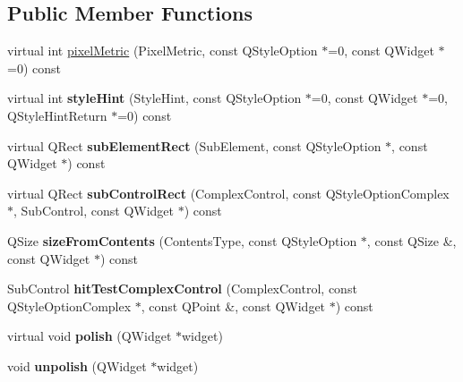 \subsection*{Public Member Functions}
\begin{DoxyCompactItemize}
\item 
virtual int \hyperlink{class_mg_style_af9090dfb05c3d8874a57eb237363b111}{pixel\+Metric} (Pixel\+Metric, const Q\+Style\+Option $\ast$=0, const Q\+Widget $\ast$=0) const
\item 
\mbox{\label{class_mg_style_a9c528faa0bfe29d7354443dd2e183a39}} 
virtual int {\bfseries style\+Hint} (Style\+Hint, const Q\+Style\+Option $\ast$=0, const Q\+Widget $\ast$=0, Q\+Style\+Hint\+Return $\ast$=0) const
\item 
\mbox{\label{class_mg_style_a55e50346cb797f317a26df24f4be553c}} 
virtual Q\+Rect {\bfseries sub\+Element\+Rect} (Sub\+Element, const Q\+Style\+Option $\ast$, const Q\+Widget $\ast$) const
\item 
\mbox{\label{class_mg_style_a94b75a98f71425f9be5441a89824d62f}} 
virtual Q\+Rect {\bfseries sub\+Control\+Rect} (Complex\+Control, const Q\+Style\+Option\+Complex $\ast$, Sub\+Control, const Q\+Widget $\ast$) const
\item 
\mbox{\label{class_mg_style_a0895d463d5bb9fafca488450c4cf077c}} 
Q\+Size {\bfseries size\+From\+Contents} (Contents\+Type, const Q\+Style\+Option $\ast$, const Q\+Size \&, const Q\+Widget $\ast$) const
\item 
\mbox{\label{class_mg_style_a350316ad09a86d6eeb1a5f2d30194361}} 
Sub\+Control {\bfseries hit\+Test\+Complex\+Control} (Complex\+Control, const Q\+Style\+Option\+Complex $\ast$, const Q\+Point \&, const Q\+Widget $\ast$) const
\item 
\mbox{\label{class_mg_style_a51959bf9ecaafbe71f05c568d7c583df}} 
virtual void {\bfseries polish} (Q\+Widget $\ast$widget)
\item 
\mbox{\label{class_mg_style_a7a93b5438741237e40751b104c4c7025}} 
void {\bfseries unpolish} (Q\+Widget $\ast$widget)
\item 
\mbox{\label{class_mg_style_a70d313223cad428c6b1a4c5ecd88665e}} 

\end{DoxyCompactItemize}
